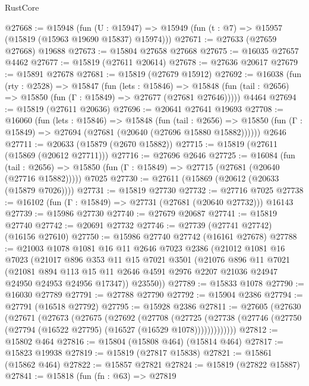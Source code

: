 \begin{lexlean}{RustCore}
\begin{coremodule}
@27668 := @15948
    (fun (U : @15947) => @15949 (fun (t : @7) => @15957 (@15819 (@15963 @19690 @15837) @15974)))
@27671 := @27633 (@27659 @27668) @19688
@27673 := @15804 @27658 @27668
@27675 := @16035 @27657 @4462
@27677 := @15819 (@27611 @20614)
@27678 := @27636 @20617
@27679 := @15891 @27678
@27681 := @15819 (@27679 @15912)
@27692 := @16038
    (fun (rty : @2528) =>
    @15847
      (fun (lets : @15846) =>
      @15848 (fun (tail : @2656) => @15850 (fun (Γ : @15849) => @27677 (@27681 @27646)))))
    @4464
@27694 := @15819 (@27611 @20636)
@27696 := @20641 @27641 @19693
@27708 := @16060
    (fun (lets : @15846) =>
    @15848
      (fun (tail : @2656) =>
      @15850 (fun (Γ : @15849) => @27694 (@27681 (@20640 (@27696 @15880 @15882))))))
    @2646
@27711 := @20633 (@15879 (@2670 @15882))
@27715 := @15819 (@27611 (@15869 (@20612 @27711)))
@27716 := @27696 @2646
@27725 := @16084
    (fun (tail : @2656) => @15850 (fun (Γ : @15849) => @27715 (@27681 (@20640 (@27716 @15882)))))
    @7025
@27730 := @27611 (@15869 (@20612 (@20633 (@15879 @7026))))
@27731 := @15819 @27730
@27732 := @27716 @7025
@27738 := @16102 (fun (Γ : @15849) => @27731 (@27681 (@20640 @27732))) @16143
@27739 := @15986 @27730
@27740 := @27679 @20687
@27741 := @15819 @27740
@27742 := @20691 @27732
@27746 := @27739 (@27741 @27742) (@16156 @27610)
@27750 := @15986 @27740 @27742 (@16161 @27678)
@27788 := @21003
    @1078
    @1081
    @16
    @11
    @2646
    @7023
    @2386
    (@21012
      @1081
      @16
      @7023
      (@21017
        @896
        @353
        @11
        @15
        @7021
        @3501
        (@21076
          @896
          @11
          @7021
          (@21081
            @894
            @113
            @15
            @11
            @2646
            @4591
            @2976
            @2207
            @21036
            @24947
            @24950
            @24953
            @24956
            @17347))
        @23550))
@27789 := @15833 @1078
@27790 := @16030 @27789
@27791 := @27788 @27790
@27792 := @15904 @2386
@27794 := @27791 (@16518 @27792)
@27795 := @15928 @2386
@27811 := @27605
    (@27630
      (@27671
        (@27673
          (@27675
            (@27692
              (@27708
                (@27725
                  (@27738 (@27746 (@27750 (@27794 (@16522 @27795) (@16527 (@16529 @1078)))))))))))))
@27812 := @15802 @464
@27816 := @15804 (@15808 @464) (@15814 @464)
@27817 := @15823 @19938
@27819 := @15819 (@27817 @15838)
@27821 := @15861 (@15862 @464)
@27822 := @15857 @27821
@27824 := @15819 (@27822 @15887)
@27841 := @15818
    (fun (fn : @63) =>
    @27819

\end{coremodule}
\end{lexlean}
